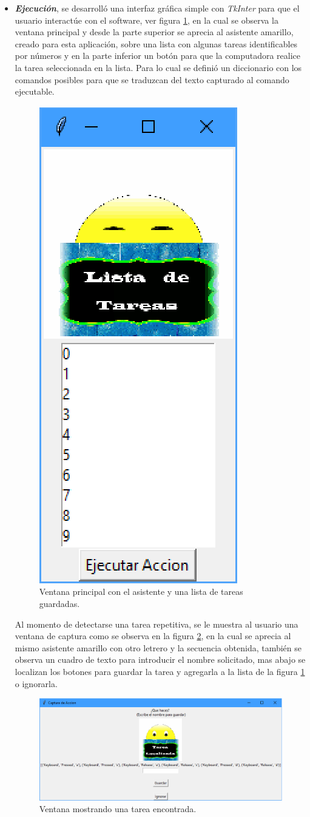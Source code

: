 \begin{itemize}
\item{ \textbf{\emph{Ejecuci\'on}}, se desarroll\'o una interfaz gr\'afica 
 simple con \emph{TkInter} para que el usuario interact\'ue con el software,  
 ver figura \ref{fig:v01}, en la cual se observa la ventana principal y 
 desde la parte superior se aprecia al asistente amarillo, creado para esta 
 aplicaci\'on, sobre una lista con algunas tareas identificables por 
 n\'umeros y en la parte inferior un bot\'on para que la computadora realice 
 la tarea seleccionada en la lista. Para lo cual se defini\'o un diccionario 
 con los comandos posibles para que se traduzcan del texto capturado al 
 comando ejecutable. 


\begin{figure}[H]
\centering
\includegraphics[width=0.2\columnwidth]{chap4/Imagenes/ventana1.eps}
\caption{Ventana principal con el asistente y una lista de tareas
 guardadas.}
\label{fig:v01}
\end{figure} 


Al momento de detectarse una tarea repetitiva, se le muestra al usuario una 
 ventana de captura como se observa en la figura \ref{fig:v02}, en la cual 
 se aprecia al mismo asistente amarillo con otro letrero y la secuencia 
 obtenida, tambi\'en se observa un cuadro de texto para introducir el nombre 
 solicitado, mas abajo se localizan los botones para guardar la tarea y 
 agregarla a la lista de la figura \ref{fig:v01} o ignorarla.}

\begin{figure}[H]
\centering
\includegraphics[width=1.0\columnwidth]{chap4/Imagenes/ventana2.eps}
\caption{Ventana mostrando una tarea encontrada.}
\label{fig:v02}
\end{figure}


\end{itemize}
